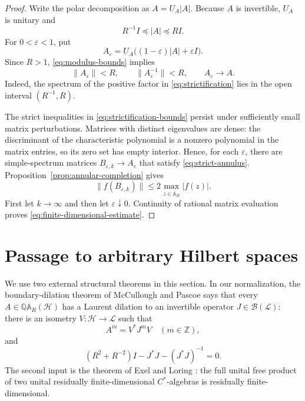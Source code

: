 \documentclass[preprints,article,submit,oneauthor]{Definitions/mdpi}
\theoremstyle{mdpi}
\theoremstyle{definition}
\begin{document}
\begin{proof}
Write the polar decomposition as $A=U_A\lvert A\rvert$.  Because $A$
is invertible, $U_A$ is unitary and
\begin{equation}
  R^{-1}I\preceq\lvert A\rvert\preceq RI.
  \label{eq:modulus-bounds}
\end{equation}
For $0<\varepsilon<1$, put
\begin{equation}
  A_\varepsilon
  =U_A\bigl((1-\varepsilon)\lvert A\rvert+\varepsilon I\bigr).
  \label{eq:strictification}
\end{equation}
Since $R>1$, \eqref{eq:modulus-bounds} implies
\begin{equation}
  \lVert A_\varepsilon\rVert<R,
  \qquad
  \lVert A_\varepsilon^{-1}\rVert<R,
  \qquad
  A_\varepsilon\longrightarrow A.
  \label{eq:strictification-bounds}
\end{equation}
Indeed, the spectrum of the positive factor in
\eqref{eq:strictification} lies in the open interval $(R^{-1},R)$.

The strict inequalities in \eqref{eq:strictification-bounds} persist
under sufficiently small matrix perturbations.  Matrices with distinct
eigenvalues are dense: the discriminant of the characteristic
polynomial is a nonzero polynomial in the matrix entries, so its zero
set has empty interior.  Hence, for each $\varepsilon$, there are
simple-spectrum matrices $B_{\varepsilon,k}\to A_\varepsilon$ that
satisfy \eqref{eq:strict-annulus}.  Proposition~\ref{prop:annular-completion}
gives
\[
  \lVert f(B_{\varepsilon,k})\rVert
  \leq2\max_{z\in\overline{\mathbb A}_R}\lvert f(z)\rvert.
\]
First let $k\to\infty$ and then let $\varepsilon\downarrow0$.
Continuity of rational matrix evaluation proves
\eqref{eq:finite-dimensional-estimate}.
\end{proof}

\section{Passage to arbitrary Hilbert spaces}
\label{sec:all-Hilbert-spaces}

We use two external structural theorems in this section.  In our
normalization, the boundary-dilation theorem of McCullough and Pascoe
\cite[Theorem~1.1 and Proposition~3.2]{McCulloughPascoe2023} says that
every $A\in\mathbb Q\mathbb A_R(\mathcal H)$ has a Laurent dilation to
an invertible operator $J\in\mathcal B(\mathcal L)$: there is an
isometry $V\colon\mathcal H\to\mathcal L$ such that
\begin{equation}
  A^m=V^*J^mV
  \quad(m\in\mathbb Z),
  \label{eq:Laurent-dilation}
\end{equation}
and
\begin{equation}
  (R^2+R^{-2})I-J^*J-(J^*J)^{-1}=0.
  \label{eq:boundary-equation}
\end{equation}
The second input is the theorem of Exel and Loring
\cite[Theorem~3.2]{ExelLoring1992}: the full unital free product of two
unital residually finite-dimensional $C^*$-algebras is residually
finite-dimensional.
\end{document}
